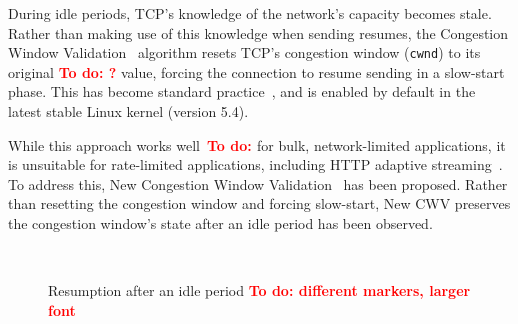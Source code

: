 \documentclass[10pt,sigconf,anonymous]{acmart}
\newcommand{\todo}[1]{\textbf{\textcolor{red}{To do: #1}}}
\begin{document}

During idle periods, TCP's knowledge of the network's capacity becomes stale. Rather than making use of this knowledge when sending resumes, the Congestion Window Validation~\cite{rfc2861-2000-padhye-congestion-window-validation} algorithm resets TCP's congestion window (\texttt{cwnd}) to its original \todo{?} value, forcing the connection to resume sending in a slow-start phase. This has become standard practice~\cite{rfc5681-congeston-control}, and is enabled by default in the latest stable Linux kernel (version 5.4).

While this approach works well~\todo{\cite{..}} for bulk, network-limited applications, it is unsuitable for rate-limited applications, including HTTP adaptive streaming~\cite{Esteban-2012-Interactions-HTTP-TCP}. To address this, New Congestion Window Validation~\cite{rfc7661-2015-fairhurst-new-cwnd-validation} has been proposed. Rather than resetting the congestion window and forcing slow-start, New CWV preserves the congestion window's state after an idle period has been observed. 

\begin{figure}[t!]
  \centering
    \\
    \caption{Resumption after an idle period \todo{different markers, larger font}}
    \label{fig:transmission-after-idle}
\end{figure}
\end{document}
